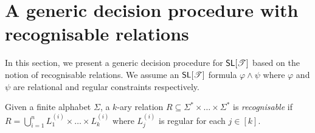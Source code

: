 



\section{A generic decision procedure with recognisable relations} \label{sec:algo}

In this section,  we present a generic decision procedure for $\textsf{SL}[\mathscr{T}]$ based on the notion of recognisable relations. We assume an $\textsf{SL}[\mathscr{T}]$ formula $\varphi \wedge \psi$ where $\varphi$ and $\psi$ are relational and  regular constraints respectively.

\begin{definition}
	Given a finite alphabet $\Sigma$, a $k$-ary relation $R\subseteq \Sigma^*\times \ldots\times \Sigma^*$ is \emph{recognisable}  if $R=\bigcup_{i=1}^n L^{(i)}_1\times \ldots\times L^{(i)}_k$ where $L^{(i)}_j$ is regular for each $j\in [k]$.
%
\end{definition}


